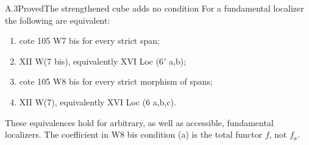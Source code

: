 \begin{claim}{A.3}{Proved}{The strengthened cube adds no condition}\label{A3}
For a fundamental localizer the following are equivalent:
\begin{enumerate}[label=(\roman*),leftmargin=2.2em]
\item cote 105 W7 bis for every strict span;
\item XII W(7 bis), equivalently XVI Loc (6$'$ a,b);
\item cote 105 W8 bis for every strict morphism of spans;
\item XII W(7), equivalently XVI Loc (6 a,b,c).
\end{enumerate}
These equivalences hold for arbitrary, as well as accessible, fundamental localizers. The coefficient in W8 bis condition (a) is the total functor $f$, not $f_a$.
\end{claim}
